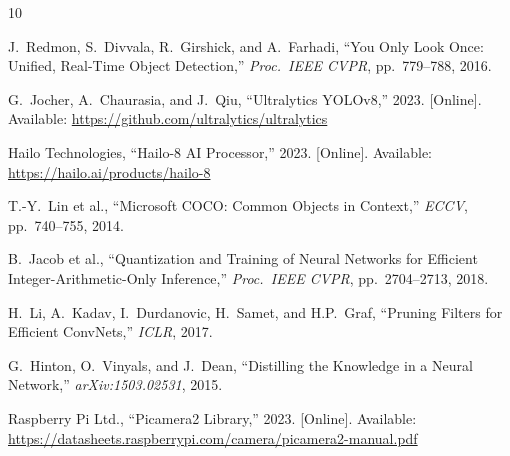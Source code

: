 \documentclass[journal, onecolumn]{IEEEtran}
\begin{document}
\ifCLASSOPTIONcaptionsoff\newpage\fi

\begin{thebibliography}{10}

J.\ Redmon, S.\ Divvala, R.\ Girshick, and A.\ Farhadi,
``You Only Look Once: Unified, Real-Time Object Detection,''
\emph{Proc.\ IEEE CVPR}, pp.\ 779--788, 2016.

G.\ Jocher, A.\ Chaurasia, and J.\ Qiu,
``Ultralytics YOLOv8,'' 2023.
[Online]. Available: \url{https://github.com/ultralytics/ultralytics}

Hailo Technologies,
``Hailo-8 AI Processor,'' 2023.
[Online]. Available: \url{https://hailo.ai/products/hailo-8}

T.-Y.\ Lin et al.,
``Microsoft COCO: Common Objects in Context,''
\emph{ECCV}, pp.\ 740--755, 2014.

B.\ Jacob et al.,
``Quantization and Training of Neural Networks for Efficient Integer-Arithmetic-Only Inference,''
\emph{Proc.\ IEEE CVPR}, pp.\ 2704--2713, 2018.

H.\ Li, A.\ Kadav, I.\ Durdanovic, H.\ Samet, and H.P.\ Graf,
``Pruning Filters for Efficient ConvNets,''
\emph{ICLR}, 2017.

G.\ Hinton, O.\ Vinyals, and J.\ Dean,
``Distilling the Knowledge in a Neural Network,''
\emph{arXiv:1503.02531}, 2015.

Raspberry Pi Ltd.,
``Picamera2 Library,'' 2023.
[Online]. Available: \url{https://datasheets.raspberrypi.com/camera/picamera2-manual.pdf}

\end{thebibliography}

\vfill
\end{document}
